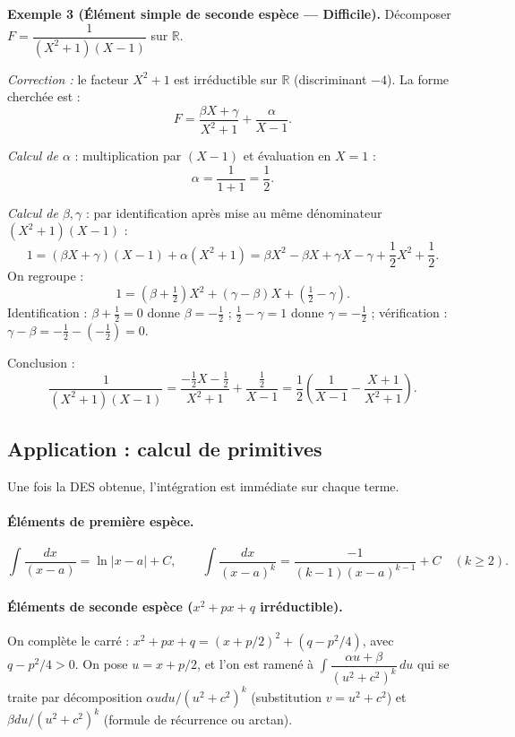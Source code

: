 \documentclass[12pt,a4paper]{report}
\theoremstyle{definition}
\theoremstyle{remark}
\begin{document}
\medskip

\textbf{Exemple 3 (Élément simple de seconde espèce --- Difficile).}
Décomposer $F = \dfrac{1}{(X^2 + 1)(X - 1)}$ sur $\mathbb{R}$.

\textit{Correction :} le facteur $X^2 + 1$ est irréductible sur $\mathbb{R}$ (discriminant $-4$). La forme cherchée est :
\[ F = \frac{\beta X + \gamma}{X^2 + 1} + \frac{\alpha}{X - 1}. \]

\emph{Calcul de $\alpha$} : multiplication par $(X - 1)$ et évaluation en $X = 1$ :
\[ \alpha = \frac{1}{1 + 1} = \frac{1}{2}. \]

\emph{Calcul de $\beta, \gamma$} : par identification après mise au même dénominateur $(X^2 + 1)(X - 1)$ :
\[ 1 = (\beta X + \gamma)(X - 1) + \alpha (X^2 + 1) = \beta X^2 - \beta X + \gamma X - \gamma + \frac{1}{2} X^2 + \frac{1}{2}. \]
On regroupe :
\[ 1 = \left( \beta + \tfrac{1}{2} \right) X^2 + (\gamma - \beta) X + \left( \tfrac{1}{2} - \gamma \right). \]
Identification :
$\beta + \tfrac{1}{2} = 0$ donne $\beta = -\tfrac{1}{2}$ ;
$\tfrac{1}{2} - \gamma = 1$ donne $\gamma = -\tfrac{1}{2}$ ;
vérification : $\gamma - \beta = -\tfrac{1}{2} - (-\tfrac{1}{2}) = 0$. \checkmark

\smallskip

Conclusion :
\[ \frac{1}{(X^2 + 1)(X - 1)} = \frac{-\tfrac{1}{2} X - \tfrac{1}{2}}{X^2 + 1} + \frac{\tfrac{1}{2}}{X - 1} = \frac{1}{2} \left( \frac{1}{X - 1} - \frac{X + 1}{X^2 + 1} \right). \]

\subsection{Application : calcul de primitives}

Une fois la DES obtenue, l'intégration est immédiate sur chaque terme.

\paragraph{Éléments de première espèce.}
\[ \int \frac{dx}{(x - a)} = \ln |x - a| + C, \qquad \int \frac{dx}{(x - a)^k} = \frac{-1}{(k - 1) (x - a)^{k - 1}} + C \quad (k \ge 2). \]

\paragraph{Éléments de seconde espèce ($x^2 + p x + q$ irréductible).}
On complète le carré : $x^2 + p x + q = (x + p/2)^2 + (q - p^2/4)$, avec $q - p^2/4 > 0$. On pose $u = x + p/2$, et l'on est ramené à $\int \dfrac{\alpha u + \beta}{(u^2 + c^2)^k}\, du$ qui se traite par décomposition $\alpha u du / (u^2 + c^2)^k$ (substitution $v = u^2 + c^2$) et $\beta du / (u^2 + c^2)^k$ (formule de récurrence ou arctan).
\end{document}
